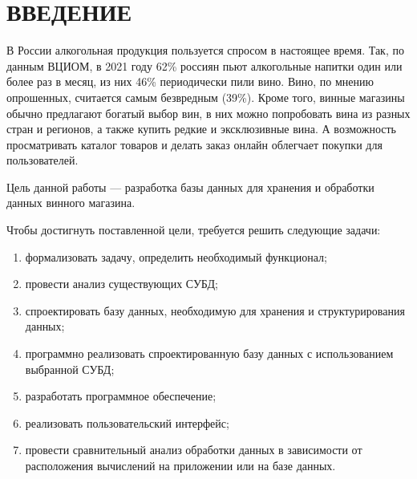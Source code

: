 \chapter*{ВВЕДЕНИЕ}

В России алкогольная продукция пользуется спросом в настоящее время. Так, по данным ВЦИОМ\cite{vciom}, в 2021 году 62\% россиян пьют алкогольные напитки один или более раз в месяц, из них 46\% периодически пили вино. Вино, по мнению опрошенных, считается самым безвредным (39\%).
Кроме того, винные магазины обычно предлагают богатый выбор вин, в них можно попробовать вина из разных стран и регионов, а также купить редкие и эксклюзивные вина. А возможность просматривать каталог товаров и делать заказ онлайн облегчает покупки для пользователей.

Цель данной работы --- разработка базы данных для хранения и обработки
данных винного магазина. 

Чтобы достигнуть поставленной цели, требуется решить следующие задачи:
\begin{enumerate}[label=\arabic*)]
	\item формализовать задачу, определить необходимый функционал;
	\item провести анализ существующих СУБД;
	\item спроектировать базу данных, необходимую для хранения и структурирования данных;
	\item программно реализовать спроектированную базу данных с использованием выбранной СУБД;
        \item разработать программное обеспечение;
	\item реализовать пользовательский интерфейс;
        \item провести сравнительный анализ обработки данных в зависимости от расположения вычислений на приложении или на базе данных.
\end{enumerate} 